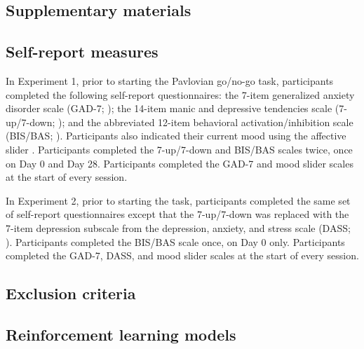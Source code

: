 \documentclass[a4paper,12pt]{article}
\begin{document}
\break
\begin{refsection}[supp]
\section*{Supplementary materials}
\setcounter{figure}{0}
\setcounter{table}{0}
\renewcommand{\thetable}{S\arabic{table}}
\renewcommand{\thefigure}{S\arabic{figure}}

\subsection*{Self-report measures}

In Experiment 1, prior to starting the Pavlovian go/no-go task, participants completed the following self-report questionnaires: the 7-item generalized anxiety disorder scale (GAD-7; \cite{spitzer2006brief}); the 14-item manic and depressive tendencies scale (7-up/7-down; \cite{youngstrom20137}); and the abbreviated 12-item behavioral activation/inhibition scale (BIS/BAS; \cite{pagliaccio2016revising}). Participants also indicated their current mood using the affective slider \cite{betella2016affective}. Participants completed the 7-up/7-down and BIS/BAS scales twice, once on Day 0 and Day 28. Participants completed the GAD-7 and mood slider scales at the start of every session. 

In Experiment 2, prior to starting the task, participants completed the same set of self-report questionnaires except that the 7-up/7-down was replaced with the 7-item depression subscale from the depression, anxiety, and stress scale (DASS; \cite{henry2005short}). Participants completed the BIS/BAS scale once, on Day 0 only. Participants completed the GAD-7, DASS, and mood slider scales at the start of every session. 

\subsection*{Exclusion criteria}

\subsection*{Reinforcement learning models}


\end{refsection}
\end{document}
